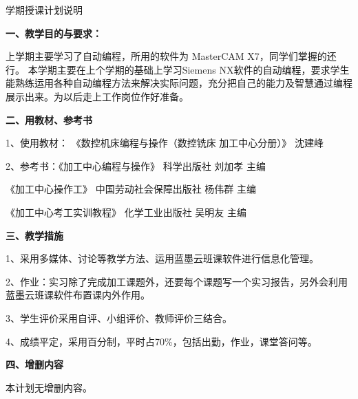 \documentclass{ctexart}
\begin{document}

\jhsy %

\begin{center}
 \heiti 学期授课计划说明
\end{center}
 \setlength{\parindent}{2em} \setlength{\baselineskip}{22pt}

\textbf{一、教学目的与要求：}

上学期主要学习了自动编程，所用的软件为 MasterCAM X7，同学们掌握的还行。
本学期主要在上个学期的基础上学习Siemens NX软件的自动编程，要求学生能熟练运用各种自动编程方法来解决实际问题，充分把自己的能力及智慧通过编程展示出来。为以后走上工作岗位作好准备。

\textbf{二、用教材、参考书}

1、使用教材： 《数控机床编程与操作（数控铣床 加工中心分册）》 沈建峰

2、参考书：《加工中心编程与操作》  科学出版社  刘加孝   主编

\hspace{5em}《加工中心操作工》 中国劳动社会保障出版社  杨伟群  主编

\hspace{5em}《加工中心考工实训教程》  化学工业出版社   吴明友 主编

\textbf{三、教学措施}

1、采用多媒体、讨论等教学方法、运用蓝墨云班课软件进行信息化管理。

2、作业：实习除了完成加工课题外，还要每个课题写一个实习报告，另外会利用蓝墨云班课软件布置课内外作用。

3、学生评价采用自评、小组评价、教师评价三结合。

4、成绩平定，采用百分制，平时占70\%，包括出勤，作业，课堂答问等。

\textbf{四、增删内容}

本计划无增删内容。
\end{document}
